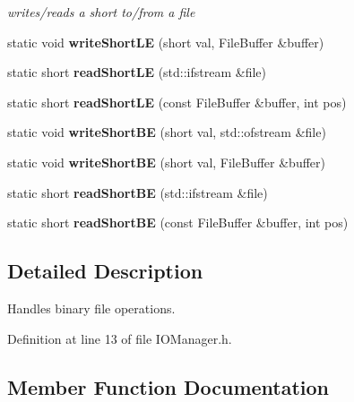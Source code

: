 \begin{DoxyCompactItemize}
\begin{DoxyCompactList}\small\item\em writes/reads a short to/from a file \end{DoxyCompactList}\item 
\mbox{\label{classnta_1_1IOManager_af82bd388b442f6a000a77db9db1a0531}} 
static void {\bfseries write\+Short\+LE} (short val, File\+Buffer \&buffer)
\item 
\mbox{\label{classnta_1_1IOManager_a8b27fbf996c44a65b0af6b828d8e9c77}} 
static short {\bfseries read\+Short\+LE} (std\+::ifstream \&file)
\item 
\mbox{\label{classnta_1_1IOManager_a919417bb852149b2b26e39701f39d1e7}} 
static short {\bfseries read\+Short\+LE} (const File\+Buffer \&buffer, int pos)
\item 
\mbox{\label{classnta_1_1IOManager_a6051d755ed8d3ec7decb1220e074ff7f}} 
static void {\bfseries write\+Short\+BE} (short val, std\+::ofstream \&file)
\item 
\mbox{\label{classnta_1_1IOManager_ae259ec671f9b93d9cb187ef90f099529}} 
static void {\bfseries write\+Short\+BE} (short val, File\+Buffer \&buffer)
\item 
\mbox{\label{classnta_1_1IOManager_a7efe1f57000ebd15ec5cdd7266183495}} 
static short {\bfseries read\+Short\+BE} (std\+::ifstream \&file)
\item 
\mbox{\label{classnta_1_1IOManager_a110e5635fb70e27268c9feeac9ac9a09}} 
static short {\bfseries read\+Short\+BE} (const File\+Buffer \&buffer, int pos)
\end{DoxyCompactItemize}


\subsection{Detailed Description}
Handles binary file operations. 

Definition at line 13 of file I\+O\+Manager.\+h.



\subsection{Member Function Documentation}
\mbox{\label{classnta_1_1IOManager_abbfd9da05b22aa488043a19344d38e0a}} 
